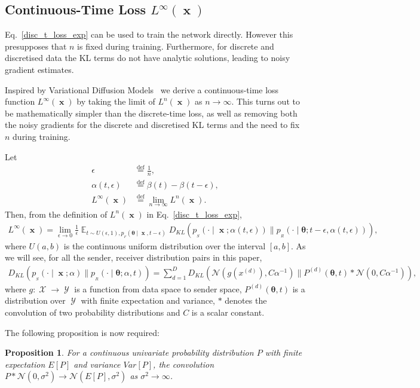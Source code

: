 \documentclass[11pt,table]{article}
\DeclareMathOperator*{\E}{\mathbb{E}}
\DeclareMathOperator{\x}{\mathbf{x}}
\DeclareMathOperator{\X}{\mathcal{X}}
\DeclareMathOperator{\Y}{\mathcal{Y}}
\newcommand{\kl}[2]{D_{KL}\left(#1 \parallel #2\right)}
\newcommand{\N}[2]{\mathcal{N}\left(#1 , #2\right)}
\newcommand*{\defeq}{\stackrel{\text{def}}{=}}
\newtheorem{proposition}[theorem]{Proposition}
\newcommand{\didx}[2]{#1^{(#2)}}
\renewcommand{\vec}[1]{\boldsymbol{#1}}
\newcommand{\pars}{\theta}
\newcommand{\parsn}{\vec{\pars}}
\newcommand{\0}[1]{\constvec{0}{#1}}
\newcommand{\1}[1]{\constvec{1}{#1}}
\newcommand{\xdd}[1]{\didx{x}{#1}}
\newcommand{\sender}[2]{p_{_S}\left(#1 \mid #2\right)}
\newcommand{\rec}{p_{_R}}
\newcommand{\flow}{p_{_F}}
\begin{document}
\subsection{Continuous-Time Loss \texorpdfstring{$L^{\infty}(\x)$}{}}
Eq.~\ref{disc_t_loss_exp} can be used to train the network directly.
However this presupposes that $n$ is fixed during training.
Furthermore, for discrete and discretised data the KL terms do not have analytic solutions, leading to noisy gradient estimates.

Inspired by Variational Diffusion Models~\cite{kingma2021variational} we derive a continuous-time loss function $L^{\infty}(\x)$ by taking the limit of $L^{n}(\x)$ as $n \rightarrow \infty$.
This turns out to be mathematically simpler than the discrete-time loss, as well as removing both the noisy gradients for the discrete and discretised KL terms and the need to fix $n$ during training.

Let
\begin{align}
\epsilon &\defeq \frac{1}{n},\\
\alpha(t, \epsilon) &\defeq \beta(t) - \beta(t-\epsilon),\label{deltat}\\
L^{\infty}(\x) &\defeq \lim_{n\rightarrow\infty}L^n(\x).
\end{align}
Then, from the definition of $L^n(\x)$ in Eq.~\ref{disc_t_loss_exp},
\begin{align}
L^{\infty}(\x) = \lim_{\epsilon \rightarrow 0} \frac{1}{\epsilon} \E_{t \sim U(\epsilon,1), \flow(\parsn \mid \x, t-\epsilon)} \kl{\sender{\cdot}{\x; \alpha(t, \epsilon)}}{\rec(\cdot \mid \parsn; t-\epsilon, \alpha(t, \epsilon))},
\end{align}
where $U(a,b)$ is the continuous uniform distribution over the interval $[a,b]$.
As we will see, for all the sender, receiver distribution pairs in this paper,
\begin{align}
\kl{\sender{\cdot}{\x; \alpha}}{\rec(\cdot \mid \parsn; \alpha, t)} = \sum_{d=1}^D\kl{\N{g(\xdd{d})}{C\alpha^{-1}}}{P^{(d)}(\parsn, t) \ast \N{0}{C\alpha^{-1}}}\label{convkl},
\end{align}
where $g: \X \rightarrow \Y$ is a function from data space to sender space, $P^{(d)}(\parsn, t)$ is a distribution over $\Y$ with finite expectation and variance, $\ast$ denotes the convolution of two probability distributions and $C$ is a scalar constant.

The following proposition is now required:
\begin{proposition}\label{proposition}
For a continuous univariate probability distribution $P$ with finite expectation $E[P]$ and variance $Var[P]$, the convolution $P \ast \N{0}{\sigma^2} \rightarrow \N{E[P]}{\sigma^2}$ as $\sigma^2 \rightarrow \infty$.
\end{proposition}
\end{document}
